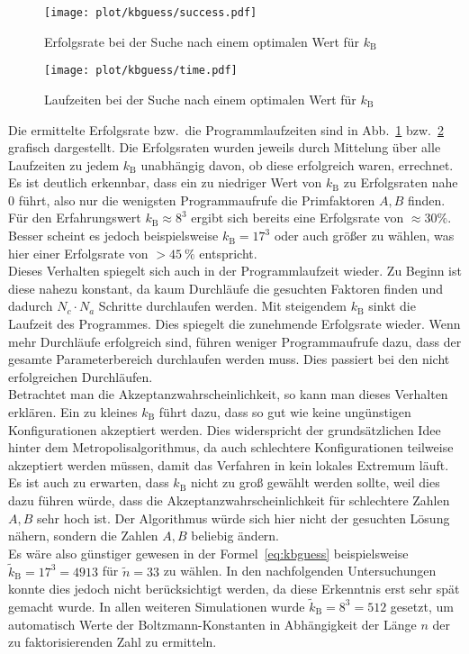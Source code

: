 \begin{figure}[!ht]
		\centering
		\texttt{[image: plot/kbguess/success.pdf]}
		\caption{Erfolgsrate bei der Suche nach einem optimalen Wert für $k_\mathrm{B}$}\label{fig:kbguess-success}
\end{figure}

\begin{figure}[!ht]
		\centering
		\texttt{[image: plot/kbguess/time.pdf]}
		\caption{Laufzeiten bei der Suche nach einem optimalen Wert für $k_\mathrm{B}$}\label{fig:kbguess-runtime}
\end{figure}

Die ermittelte Erfolgsrate bzw.\ die Programmlaufzeiten sind in Abb.~\ref{fig:kbguess-success} bzw.~\ref{fig:kbguess-runtime} grafisch dargestellt. Die Erfolgsraten wurden jeweils durch Mittelung über alle Laufzeiten zu jedem $k_\mathrm{B}$ unabhängig davon, ob diese erfolgreich waren, errechnet. \\
Es ist deutlich erkennbar, dass ein zu niedriger Wert von $k_\mathrm{B}$ zu Erfolgsraten nahe $0$ führt, also nur die wenigsten Programmaufrufe die Primfaktoren $A,B$ finden. Für den Erfahrungswert $k_\mathrm{B}\approx 8^3$ ergibt sich bereits eine Erfolgsrate von $\approx30\%$. Besser scheint es jedoch beispielsweise $k_\mathrm{B}=17^3$ oder auch größer zu wählen, was hier einer Erfolgsrate von $>\SI{45}{\percent}$ entspricht. \\
Dieses Verhalten spiegelt sich auch in der Programmlaufzeit wieder. Zu Beginn ist diese nahezu konstant, da kaum Durchläufe die gesuchten Faktoren finden und dadurch $N_c\cdot N_a$ Schritte durchlaufen werden. Mit steigendem $k_\mathrm{B}$ sinkt die Laufzeit des Programmes. Dies spiegelt die zunehmende Erfolgsrate wieder. Wenn mehr Durchläufe erfolgreich sind, führen weniger Programmaufrufe dazu, dass der gesamte Parameterbereich durchlaufen werden muss. Dies passiert bei den nicht erfolgreichen Durchläufen. \\
Betrachtet man die Akzeptanzwahrscheinlichkeit, so kann man dieses Verhalten erklären. Ein zu kleines $k_\mathrm{B}$ führt dazu, dass so gut wie keine ungünstigen Konfigurationen akzeptiert werden. Dies widerspricht der grundsätzlichen Idee hinter dem Metropolisalgorithmus, da auch schlechtere Konfigurationen teilweise akzeptiert werden müssen, damit das Verfahren in kein lokales Extremum läuft. Es ist auch zu erwarten, dass $k_\mathrm{B}$ nicht zu groß gewählt werden sollte, weil dies dazu führen würde, dass die Akzeptanzwahrscheinlichkeit für schlechtere Zahlen $A, B$ sehr hoch ist. Der Algorithmus würde sich hier nicht der gesuchten Lösung nähern, sondern die Zahlen $A, B$ beliebig ändern. \\
Es wäre also günstiger gewesen in der Formel~\eqref{eq:kbguess} beispielsweise $\tilde{k}_\mathrm{B}=17^3=4913$ für $\tilde{n}=33$ zu wählen. In den nachfolgenden Untersuchungen konnte dies jedoch nicht berücksichtigt werden, da diese Erkenntnis erst sehr spät gemacht wurde. In allen weiteren Simulationen wurde $\tilde{k}_\mathrm{B}=8^3=512$ gesetzt, um automatisch Werte der Boltzmann-Konstanten in Abhängigkeit der Länge $n$ der zu faktorisierenden Zahl zu ermitteln.



